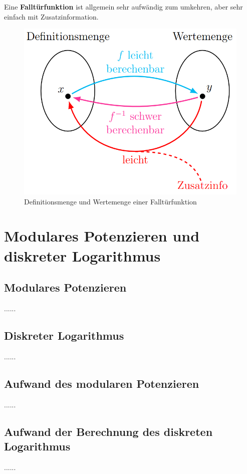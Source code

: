 Eine \textbf{Falltürfunktion} ist allgemein sehr aufwändig zum umkehren, aber sehr einfach mit Zusatzinformation.
\begin{figure}[H]
	\centering
	\includegraphics[width=0.8\linewidth]{figures/falltur_func.png}
	\caption{Definitionsmenge und Wertemenge einer Falltürfunktion}
\end{figure}

\section{Modulares Potenzieren und diskreter Logarithmus}
\subsection{Modulares Potenzieren}
......

\subsection{Diskreter Logarithmus}
......

\subsection{Aufwand des modularen Potenzieren}
......

\subsection{Aufwand der Berechnung des diskreten Logarithmus}
......

